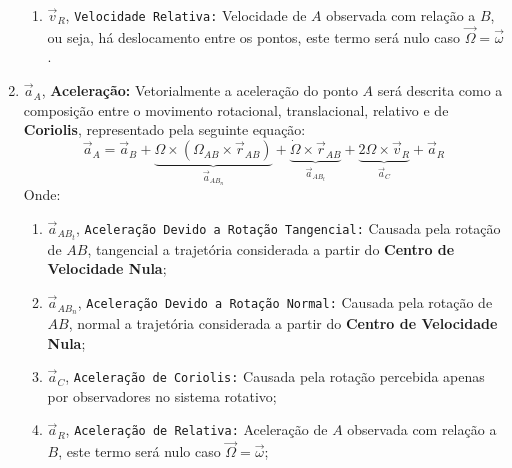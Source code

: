 \documentclass{article}
\begin{document}
\begin{enumerate}[rightmargin = \leftmargin]
\begin{enumerate}[rightmargin = \leftmargin, noitemsep]
                            \item $\vec{v}_{R}$, \texttt{Velocidade Relativa:} Velocidade de $A$ observada com relação a $B$, ou seja, há deslocamento entre os pontos, este termo será nulo caso $\vec{\Omega} = \vec{\omega}$.
                        \end{enumerate}

                    \item $\vec{a}_{A}$, \textbf{Aceleração:} Vetorialmente a aceleração do ponto $A$ será descrita como a composição entre o movimento rotacional, translacional, relativo e de \textbf{Coriolis}, representado pela seguinte equação:
                        \begin{equation}
                            \boxed{
                                \vec{a}_{A} = 
                                \vec{a}_{B} + 
                                \underbrace{
                                    \Omega\times(\Omega_{AB}\times\vec{r}_{AB})
                                }_{\vec{a}_{AB_{n}}} + 
                                \underbrace{
                                    \dot{\Omega}\times\vec{r}_{AB}
                                }_{\vec{a}_{AB_{t}}} + 
                                \underbrace{
                                    2\Omega\times\vec{v}_{R}
                                }_{\vec{a}_{C}} + 
                                \vec{a}_{R}
                            }
                        \end{equation}
                    Onde:
                        \begin{enumerate}[rightmargin = \leftmargin]
                            \item $\vec{a}_{AB_{t}}$, \texttt{Aceleração Devido a Rotação Tangencial:} Causada pela rotação de $AB$, tangencial a trajetória considerada a partir do \textbf{Centro de Velocidade Nula};

                            \item $\vec{a}_{AB_{n}}$, \texttt{Aceleração Devido a Rotação Normal:} Causada pela rotação de $AB$, normal a trajetória considerada a partir do \textbf{Centro de Velocidade Nula};

                            \item $\vec{a}_{C}$, \texttt{Aceleração de Coriolis:} Causada pela rotação percebida apenas por observadores no sistema rotativo;

                            \item $\vec{a}_{R}$, \texttt{Aceleração de Relativa:} Aceleração de $A$ observada com relação a $B$, este termo será nulo caso $\vec{\Omega} = \vec{\omega}$;
                        \end{enumerate}
                \end{enumerate}
\newpage
\end{document}
